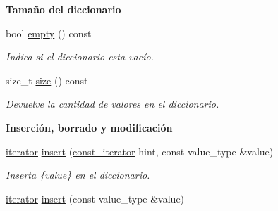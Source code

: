 \begin{Indent}{\bf \-Tamaño del diccionario}\par
\begin{DoxyCompactItemize}
\item 
bool \hyperlink{classaed2_1_1map_af5320ca0a7df4d16015441d5d055a7ee}{empty} () const 
\begin{DoxyCompactList}\small\item\em \-Indica si el diccionario esta vacío. \end{DoxyCompactList}\item 
size\-\_\-t \hyperlink{classaed2_1_1map_a89f2613f926ac13293eafe65889d6021}{size} () const 
\begin{DoxyCompactList}\small\item\em \-Devuelve la cantidad de valores en el diccionario. \end{DoxyCompactList}\end{DoxyCompactItemize}
\end{Indent}
\begin{Indent}{\bf \-Inserción, borrado y modificación}\par
\begin{DoxyCompactItemize}
\item 
\hyperlink{classaed2_1_1map_1_1iterator}{iterator} \hyperlink{classaed2_1_1map_a6941cde9a79c27f054b5c97a587a1854}{insert} (\hyperlink{classaed2_1_1map_1_1const__iterator}{const\-\_\-iterator} hint, const value\-\_\-type \&value)
\begin{DoxyCompactList}\small\item\em \-Inserta \{value\} en el diccionario. \end{DoxyCompactList}\item 
\hyperlink{classaed2_1_1map_1_1iterator}{iterator} \hyperlink{classaed2_1_1map_a60aacba06b1579630b3c8e996cf248c8}{insert} (const value\-\_\-type \&value)
\end{DoxyCompactItemize}
\end{Indent}
